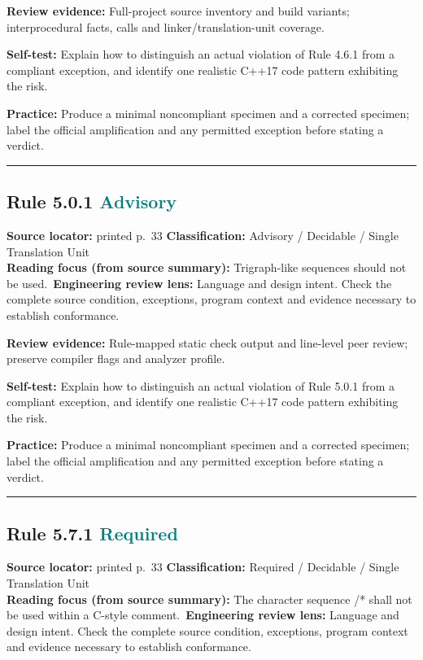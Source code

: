 \documentclass[10pt,letterpaper]{article}
\begin{document}
\textbf{Review evidence:} Full-project source inventory and build variants; interprocedural facts, calls and linker/translation-unit coverage.

\textbf{Self-test:} Explain how to distinguish an actual violation of Rule 4.6.1 from a compliant exception, and identify one realistic C++17 code pattern exhibiting the risk.\par
\textbf{Practice:} Produce a minimal noncompliant specimen and a corrected specimen; label the official amplification and any permitted exception before stating a verdict.
\smallskip\hrule\smallskip
\subsection*{Rule 5.0.1 \enspace \texorpdfstring{\small\textcolor{teal}{Advisory}}{Advisory}}
\noindent\textbf{Source locator:} printed p.~33 \quad\textbf{Classification:} Advisory / Decidable / Single Translation Unit\\
\textbf{Reading focus (from source summary):} Trigraph-like sequences should not be used.\
\textbf{Engineering review lens:} Language and design intent. Check the complete source condition, exceptions, program context and evidence necessary to establish conformance.

\textbf{Review evidence:} Rule-mapped static check output and line-level peer review; preserve compiler flags and analyzer profile.

\textbf{Self-test:} Explain how to distinguish an actual violation of Rule 5.0.1 from a compliant exception, and identify one realistic C++17 code pattern exhibiting the risk.\par
\textbf{Practice:} Produce a minimal noncompliant specimen and a corrected specimen; label the official amplification and any permitted exception before stating a verdict.
\smallskip\hrule\smallskip
\subsection*{Rule 5.7.1 \enspace \texorpdfstring{\small\textcolor{teal}{Required}}{Required}}
\noindent\textbf{Source locator:} printed p.~33 \quad\textbf{Classification:} Required / Decidable / Single Translation Unit\\
\textbf{Reading focus (from source summary):} The character sequence /* shall not be used within a C-style comment.\
\textbf{Engineering review lens:} Language and design intent. Check the complete source condition, exceptions, program context and evidence necessary to establish conformance.
\end{document}

